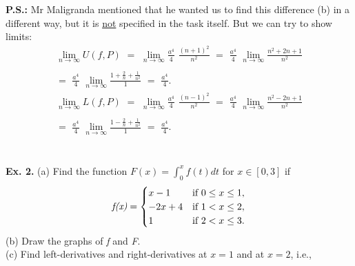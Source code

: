 \documentclass[a4paper, 12pt]{article}
\begin{document}
\textbf{P.S.:} Mr Maligranda mentioned that he wanted us to find this difference (b) in a different way, but it is \underline{not} specified in the task itself. But we can try to show limits:
\bigbreak
\begin{align*}
\lim_{n \to \infty} U(f, P) \,\, = \,\, \lim_{n \to \infty} \frac{a^4}{4} \,\, \frac{(n+1)^2}{n^2} \,\, = \,\, \frac{a^4}{4} \,\, \lim_{n \to \infty} \frac{n^2 + 2n + 1}{n^2} \\\\
= \,\, \frac{a^4}{4} \,\, \lim_{n \to \infty} \frac{1 + \frac{2}{n} + \frac{1}{n^2}}{1} 
\,\, = \,\, \frac{a^4}{4}.
\end{align*}
\bigbreak
\begin{align*}
\lim_{n \to \infty} L(f, P) \,\, = \,\, \lim_{n \to \infty} \frac{a^4}{4} \,\, \frac{(n-1)^2}{n^2} \,\, = \,\, \frac{a^4}{4} \,\, \lim_{n \to \infty} \frac{n^2 - 2n + 1}{n^2} \\\\
= \,\, \frac{a^4}{4} \,\, \lim_{n \to \infty} \frac{1 - \frac{2}{n} + \frac{1}{n^2}}{1}
\,\, = \,\, \frac{a^4}{4}.
\end{align*} \\\\
\textbf{Ex. 2.}
\bigbreak
(a) Find the function $F(x) = \int_{0}^x f(t)dt$ for $x \in [0,3]$ if
\bigbreak
\begin{equation*}
\emph{f(x)} =
	\begin{cases}
	x - 1 & \text{if } 0 \leq x \leq 1,\\
	-2x + 4 & \text{if } 1 < x \leq 2,\\
	1 & \text{if } 2 < x \leq 3.
	\end{cases}
\end{equation*}
(b) Draw the graphs of \emph{f} and \emph{F}. \\
(c) Find left-derivatives and right-derivatives at $x = 1$ and at $x = 2$, i.e.,
\end{document}
